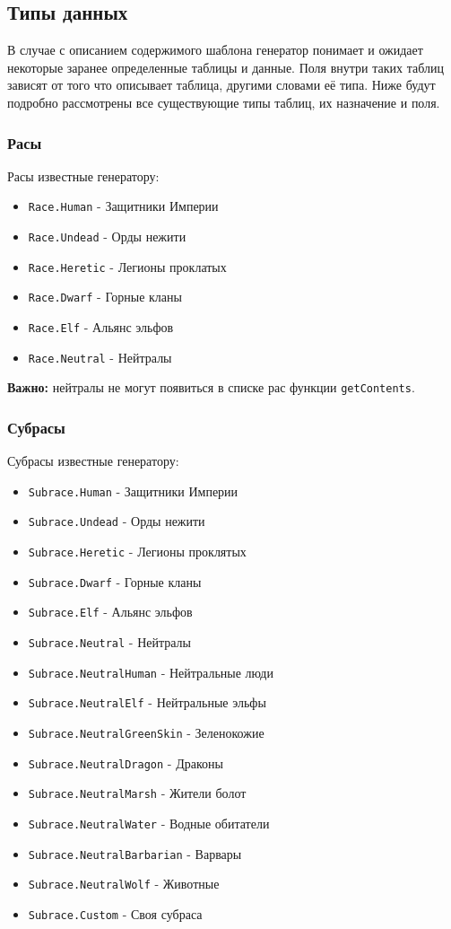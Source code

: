 \subsection{Типы данных}
В случае с описанием содержимого шаблона генератор понимает и ожидает некоторые заранее определенные таблицы и данные. Поля внутри таких таблиц зависят от того что описывает таблица, другими словами её типа. Ниже будут подробно рассмотрены все существующие типы таблиц, их назначение и поля.

\subsubsection{Расы}
\label{raceTypes}
Расы известные генератору:
\begin{itemize}
\item \texttt{Race.Human} - Защитники Империи
\item \texttt{Race.Undead} - Орды нежити
\item \texttt{Race.Heretic} - Легионы проклатых
\item \texttt{Race.Dwarf} - Горные кланы
\item \texttt{Race.Elf} - Альянс эльфов
\item \texttt{Race.Neutral} - Нейтралы
\end{itemize}
\textbf{Важно:} нейтралы не могут появиться в списке рас функции \texttt{getContents}.

\subsubsection{Субрасы}
\label{subraceTypes}
Субрасы известные генератору:
\begin{itemize}
\item \texttt{Subrace.Human} - Защитники Империи
\item \texttt{Subrace.Undead} - Орды нежити
\item \texttt{Subrace.Heretic} - Легионы проклятых
\item \texttt{Subrace.Dwarf} - Горные кланы
\item \texttt{Subrace.Elf} - Альянс эльфов
\item \texttt{Subrace.Neutral} - Нейтралы
\item \texttt{Subrace.NeutralHuman} - Нейтральные люди
\item \texttt{Subrace.NeutralElf} - Нейтральные эльфы
\item \texttt{Subrace.NeutralGreenSkin} - Зеленокожие
\item \texttt{Subrace.NeutralDragon} - Драконы
\item \texttt{Subrace.NeutralMarsh} - Жители болот
\item \texttt{Subrace.NeutralWater} - Водные обитатели
\item \texttt{Subrace.NeutralBarbarian} - Варвары
\item \texttt{Subrace.NeutralWolf} - Животные
\item \texttt{Subrace.Custom} - Своя субраса
\end{itemize}

